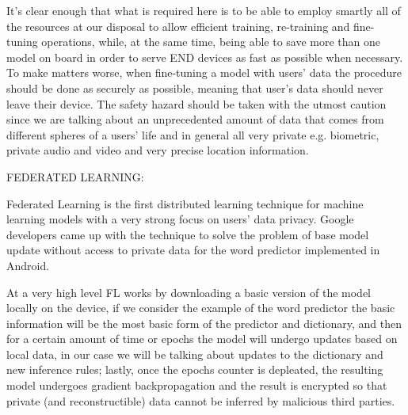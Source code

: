 It's clear enough that what is required here is to be able to employ smartly all of the resources at
our disposal to allow efficient training, re-training and fine-tuning operations, while, at the same
time, being able to save more than one model on board in order to serve END devices as fast as
possible when necessary. To make matters worse, when fine-tuning a model with users' data the
procedure should be done as securely as possible, meaning that user's data should never leave their
device. The safety hazard should be taken with the utmost caution since we are talking about an
unprecedented amount of data that comes from different spheres of a users' life and in general all
very private e.g. biometric, private audio and video and very precise location information.

\bigskip
\noindent
FEDERATED LEARNING:

Federated Learning is the first distributed learning technique for machine learning models with a
very strong focus on users' data privacy. Google developers came up with the technique to solve the
problem of base model update without access to private data for the word predictor implemented in
Android.

At a very high level FL works by downloading a basic version of the model locally on the device, if
we consider the example of the word predictor the basic information will be the most basic form of
the predictor and dictionary, and then for a certain amount of time or epochs the model will undergo
updates based on local data, in our case we will be talking about updates to the dictionary and new
inference rules; lastly, once the epochs counter is depleated, the resulting model undergoes
gradient backpropagation and the result is encrypted so that private (and reconstructible) data
cannot be inferred by malicious third parties.

